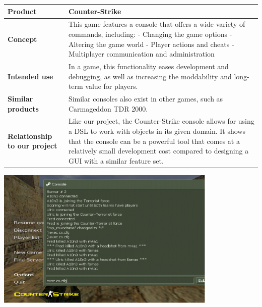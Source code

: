 \begin{center}
\begin{tabularx}{\textwidth}{ l X }
\hline
\textbf{Product} & Counter-Strike \\ \hline
\textbf{Concept} & This game features a console that offers a wide variety of commands, including:
- Changing the game options
- Altering the game world
- Player actions and cheats
- Multiplayer communication and administration \\ \hline
\textbf{Intended use} & In a game, this functionality eases development and debugging, as well as increasing the moddability and long-term value for players. \\ \hline
\textbf{Similar products} & Similar consoles also exist in other games, such as Carmageddon TDR 2000. \\ \hline
\textbf{Relationship to our project} & Like our project, the Counter-Strike console allows for using a DSL to work with objects in its given domain. It shows that the console can be a powerful tool that comes at a relatively small development cost compared to designing a GUI with a similar feature set. \\ \hline
\end{tabularx}
\label{tab:csc}
\end{center}

\begin{center}
\includegraphics[width = 0.8\textwidth]{image/counterstrike.png}
\label{cscimage}%
\end{center}

